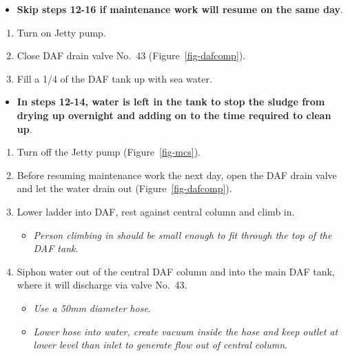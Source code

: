 \documentclass[
  letterpaper,
  DIV=11,
  numbers=noendperiod]{scrreprt}
\providecommand{\tightlist}{%
  \setlength{\itemsep}{0pt}\setlength{\parskip}{0pt}}\usepackage{longtable,booktabs,array}
\begin{document}
\begin{itemize}
\tightlist
\item
  \textbf{Skip steps 12-16 if maintenance work will resume on the same
  day}.
\end{itemize}

\begin{enumerate}
\def\labelenumi{\arabic{enumi}.}
\setcounter{enumi}{11}
\tightlist
\item
  Turn on Jetty pump.
\item
  Close DAF drain valve No.~43 (Figure~\ref{fig-dafcomp}).
\item
  Fill a 1/4 of the DAF tank up with sea water.
\end{enumerate}

\begin{itemize}
\tightlist
\item
  \textbf{In steps 12-14, water is left in the tank to stop the sludge
  from drying up overnight and adding on to the time required to clean
  up}.
\end{itemize}

\begin{enumerate}
\def\labelenumi{\arabic{enumi}.}
\setcounter{enumi}{14}
\tightlist
\item
  Turn off the Jetty pump (Figure~\ref{fig-mcs}).
\item
  Before resuming maintenance work the next day, open the DAF drain
  valve and let the water drain out (Figure~\ref{fig-dafcomp}).
\item
  Lower ladder into DAF, rest against central column and climb in.

  \begin{itemize}
  \tightlist
  \item
    \emph{Person climbing in should be small enough to fit through the
    top of the DAF tank}.
  \end{itemize}
\item
  Siphon water out of the central DAF column and into the main DAF tank,
  where it will discharge via valve No.~43.

  \begin{itemize}
  \tightlist
  \item
    \emph{Use a 50mm diameter hose}.
  \item
    \emph{Lower hose into water, create vacuum inside the hose and keep
    outlet at lower level than inlet to generate flow out of central
    column}.
  \end{itemize}
\end{enumerate}
\end{document}
